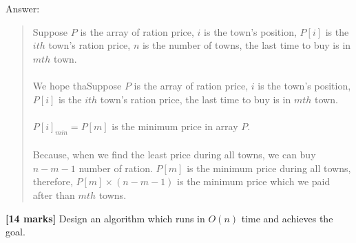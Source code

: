 \documentclass{article}
\begin{document}
\begin{Question}
\begin{Subquestion}
\begin{answer}
Answer:
\begin{quote}
    Suppose $P$ is the array of ration price, $i$ is the town's position, $P[i]$ is the $ith$ town's ration price, $n$ is the number of towns, the last time to buy is in $mth$ town.\\\\
    We hope thaSuppose $P$ is the array of ration price, $i$ is the town's position, $P[i]$ is the $ith$ town's ration price, the last time to buy is in $mth$ town.\\\\$P[i]_{min} = P[m]$ is the minimum price in array $P$.\\\\
    Because, when we find the least price during all towns, we can buy $n-m-1$ number of ration. $P[m]$ is the minimum price during all towns, therefore, $P[m] \times (n-m-1)$ is the minimum price which we paid after than $mth$ towns.\\

\end{quote}
\end{answer}
\end{Subquestion}

\clearpage
\begin{Subquestion}
\textbf{[14 marks]} Design an algorithm which runs in $O(n)$ time and achieves the goal.


\end{Subquestion}
\end{Question}
\end{document}
